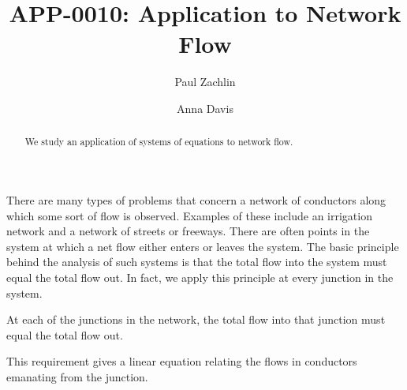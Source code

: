 \documentclass{ximera}
\author{Paul Zachlin \and Anna Davis} \title{APP-0010: Application to Network Flow} \license{CC-BY 4.0}
\begin{document}
\begin{abstract}
 We study an application of systems of equations to network flow.
\end{abstract}
\maketitle

There are many types of problems that concern a network of conductors along which some sort of flow is observed. Examples of these include an irrigation network and a network of streets or freeways. There are often points in the system at which a net flow either enters or leaves the system. The basic principle behind the analysis of such systems is that the total flow into the system must equal the total flow out. In fact, we apply this principle at every junction in the system.

\begin{theorem}\label{001735}
At each of the junctions in the network, the total flow into that junction must equal the total flow out.
\end{theorem}

\noindent This requirement gives a linear equation relating the flows in conductors emanating from the junction.
\end{document}
